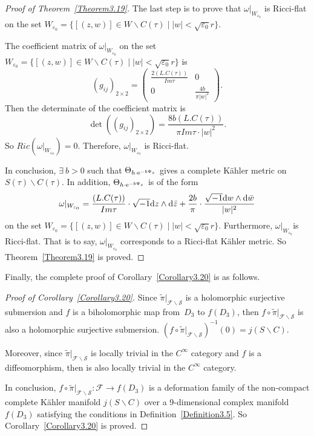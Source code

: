 \documentclass[10pt,a4paper]{amsart}
\numberwithin{equation}{section}
\def\operatorname#1{#1}
\begin{document}
\begin{proof}[Proof of Theorem~\ref{Theorem3.19}]
The last step is to prove that $\omega|_{W_{\varepsilon_0}}$ is Ricci-flat on the set $W_{\varepsilon_0}=\{ [(z,w)]\in W \backslash C(\tau)\mid |w|<\sqrt{\varepsilon_0}r \}$.

The coefficient matrix of $\omega|_{W_{\varepsilon_0}}$ on the set $W_{\varepsilon_0}=\{ [(z,w)]\in W \backslash C(\tau)\mid |w|<\sqrt{\varepsilon_0}r \}$ is \[(g_{ij})_{2 \times 2}= \begin{pmatrix}
 \frac{2 (L.C(\tau))}{\operatorname{ Im}\tau} &0\\
 0 & \frac{4b}{\pi |w|^2}
\end{pmatrix}.\]
Then the determinate of the coefficient matrix is
\[\det((g_{ij})_{2\times 2})=\frac{8b (L.C(\tau))}{\pi \operatorname{ Im}\tau \cdot |w|^2}.\]
So $\operatorname{Ric}(\omega|_{W_{\varepsilon_0}})=0$. Therefore, $\omega|_{W_{\varepsilon_0}}$ is Ricci-flat.

In conclusion, $\exists \ b>0$ such that $\Theta_{h\cdot {\rm e}^{-b\Psi_s}}$ gives a complete K\"ahler metric on $S(\tau)\backslash C(\tau)$. In addition, $\Theta_{h\cdot {\rm e}^{-b\Psi_s}}$ is of the form
\[
\omega|_{W_{\varepsilon_0}}=\frac{(L.C(\tau))}{\operatorname{ Im}\tau}\cdot \sqrt{-1} {\rm d}z \wedge {\rm d} \bar{z}+\frac{2b}{\pi} \cdot \frac{\sqrt{-1}{\rm d}w \wedge {\rm d} \bar{w}}{|w|^2}
\]
on the set $W_{\varepsilon_0}=\{[(z,w)]\in W \backslash C(\tau)\mid |w|<\sqrt{\varepsilon_0}r\}$. Furthermore, $\omega|_{W_{\varepsilon_0}}$is Ricci-flat. That is to say, $\omega|_{W_{\varepsilon_0}}$ corresponds to a Ricci-flat K\"ahler metric. So Theorem~\ref{Theorem3.19} is proved.
\end{proof}

Finally, the complete proof of Corollary~\ref{Corollary3.20} is as follows.

\begin{proof}[Proof of Corollary~\ref{Corollary3.20}]
Since $\widetilde{\pi}|_{\mathcal{F}\backslash \mathcal{S}}$ is a holomorphic surjective submersion and $f$ is a biholomorphic map from~$D_3$ to $f(D_3)$, then $f \circ \widetilde{\pi}|_{\mathcal{F}\backslash \mathcal{S}}$ is also a holomorphic surjective submersion. $(f \circ \widetilde{\pi}|_{\mathcal{F}\backslash \mathcal{S}})^{-1}(0)=j(S\backslash C)$.

Moreover, since $\widetilde{\pi}|_{\mathcal{F}\backslash \mathcal{S}}$ is locally trivial in the $C^\infty$ category and $f$ is a diffeomorphism, then  is also locally trivial in the $C^\infty$ category.

In conclusion, $f \circ \widetilde{\pi}|_{\mathcal{F}\backslash \mathcal{S}}\colon \mathcal{F} \rightarrow f(D_3)$ is a deformation family of the non-compact complete K\"ahler manifold $j(S\backslash C)$ over a 9-dimensional complex manifold $f(D_3)$ satisfying the conditions in Definition~\ref{Definition3.5}. So Corollary~\ref{Corollary3.20} is proved.
\end{proof}
\end{document}
